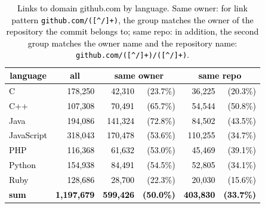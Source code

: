 \documentclass[smallextended]{svjour3}       %
\newcommand{\fix}[1]{\textcolor{black}{#1}}
\newcommand{\minor}[1]{\textcolor{black}{#1}}
\begin{document}
\begin{table}[t]
\caption{\fix{Links to domain \textsf{github.com} by language. Same owner: for link pattern \lstinline{github.com/([^/]+)}, the group matches the owner of the repository the commit belongs to; same repo: in addition, the second group matches \minor{the owner name and} the repository name: \lstinline{github.com/([^/]+)/([^/]+)}.}}
\label{tab:github-internal-links}
\centering
\fix{
\begin{tabular}{lrrrrr}
\toprule
\multicolumn{1}{c}{\textbf{language}}   & \multicolumn{1}{c}{\textbf{all}} & \multicolumn{2}{c}{\textbf{same owner}} & \multicolumn{2}{c}{\textbf{same repo}} \\
\midrule
C          & 178,250      & 42,310            & (23.7\%)          & 36,225         & (20.3\%)       \\
C++        & 107,308      & 70,491            & (65.7\%)          & 54,544         & (50.8\%)       \\
Java       & 194,086      & 141,324           & (72.8\%)          & 84,502         & (43.5\%)       \\
JavaScript & 318,043      & 170,478           & (53.6\%)          & 110,255        & (34.7\%)       \\
PHP        & 116,368      & 61,632            & (53.0\%)          & 45,469         & (39.1\%)       \\
Python     & 154,938      & 84,491            & (54.5\%)          & 52,805         & (34.1\%)       \\
Ruby       & 128,686      & 28,700            & (22.3\%)          & 20,030         & (15.6\%)       \\
\midrule
\textbf{sum}        & \textbf{1,197,679}    & \textbf{599,426}           & \textbf{(50.0\%)}          & \textbf{403,830}        & \textbf{(33.7\%)}      \\
\bottomrule
\end{tabular}
}
\end{table}
\end{document}
